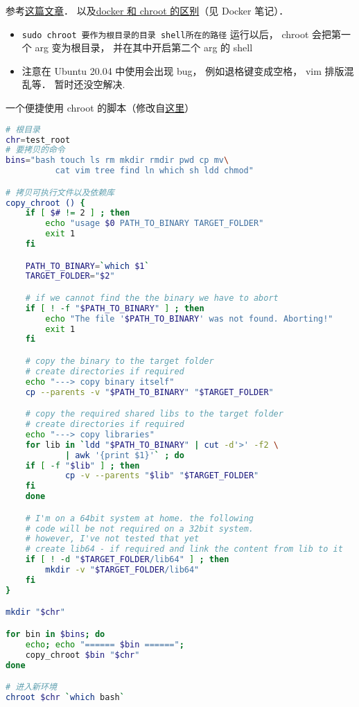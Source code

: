 
\begin{issues}
\issueDraft
\end{issues}

参考\href{https://www.howtogeek.com/441534/how-to-use-the-chroot-command-on-linux/}{这篇文章}．
以及\href{https://devops.stackexchange.com/questions/2826/difference-between-chroot-and-docker}{docker 和 chroot 的区别}（见 Docker 笔记）．

\begin{itemize}
\item \verb|sudo chroot 要作为根目录的目录 shell所在的路径| 运行以后， chroot 会把第一个 arg 变为根目录， 并在其中开启第二个 arg 的 shell
\item 注意在 Ubuntu 20.04 中使用会出现 bug， 例如退格键变成空格， vim 排版混乱等． 暂时还没空解决.
\end{itemize}

一个便捷使用 chroot 的脚本（修改自\href{https://gist.github.com/xmonader/5d1fc6134f1f65acd0d10f71453adb27}{这里}）

\begin{lstlisting}[language=bash]
# 根目录
chr=test_root
# 要拷贝的命令
bins="bash touch ls rm mkdir rmdir pwd cp mv\
          cat vim tree find ln which sh ldd chmod"

# 拷贝可执行文件以及依赖库
copy_chroot () {
	if [ $# != 2 ] ; then
		echo "usage $0 PATH_TO_BINARY TARGET_FOLDER"
		exit 1
	fi

	PATH_TO_BINARY=`which $1`
	TARGET_FOLDER="$2"

	# if we cannot find the the binary we have to abort
	if [ ! -f "$PATH_TO_BINARY" ] ; then
		echo "The file '$PATH_TO_BINARY' was not found. Aborting!"
		exit 1
	fi

	# copy the binary to the target folder
	# create directories if required
	echo "---> copy binary itself"
	cp --parents -v "$PATH_TO_BINARY" "$TARGET_FOLDER"

	# copy the required shared libs to the target folder
	# create directories if required
	echo "---> copy libraries"
	for lib in `ldd "$PATH_TO_BINARY" | cut -d'>' -f2 \
            | awk '{print $1}'` ; do
	if [ -f "$lib" ] ; then
			cp -v --parents "$lib" "$TARGET_FOLDER"
	fi  
	done

	# I'm on a 64bit system at home. the following
    # code will be not required on a 32bit system.
	# however, I've not tested that yet
	# create lib64 - if required and link the content from lib to it
	if [ ! -d "$TARGET_FOLDER/lib64" ] ; then
		mkdir -v "$TARGET_FOLDER/lib64"
	fi
}

mkdir "$chr"

for bin in $bins; do
	echo; echo "====== $bin ======";
	copy_chroot $bin "$chr"
done

# 进入新环境
chroot $chr `which bash`
\end{lstlisting}
